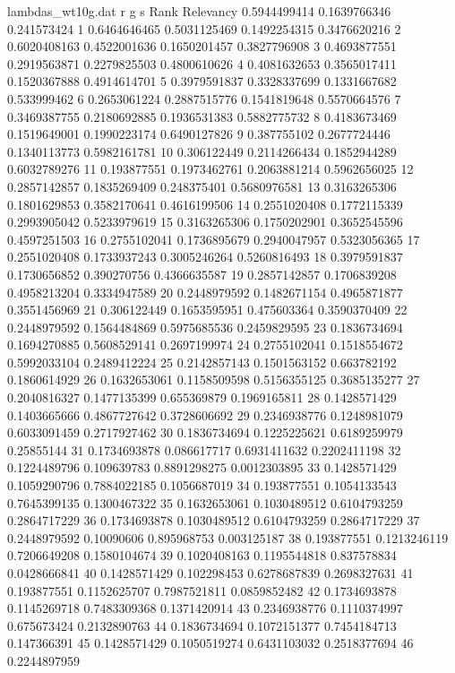 %
%


\begin{filecontents*}{lambdas_wt10g.dat}
r	g	s	Rank	Relevancy
0.5944499414	0.1639766346	0.241573424	1	0.6464646465
0.5031125469	0.1492254315	0.3476620216	2	0.6020408163
0.4522001636	0.1650201457	0.3827796908	3	0.4693877551
0.2919563871	0.2279825503	0.4800610626	4	0.4081632653
0.3565017411	0.1520367888	0.4914614701	5	0.3979591837
0.3328337699	0.1331667682	0.533999462	6	0.2653061224
0.2887515776	0.1541819648	0.5570664576	7	0.3469387755
0.2180692885	0.1936531383	0.5882775732	8	0.4183673469
0.1519649001	0.1990223174	0.6490127826	9	0.387755102
0.2677724446	0.1340113773	0.5982161781	10	0.306122449
0.2114266434	0.1852944289	0.6032789276	11	0.193877551
0.1973462761	0.2063881214	0.5962656025	12	0.2857142857
0.1835269409	0.248375401	0.5680976581	13	0.3163265306
0.1801629853	0.3582170641	0.4616199506	14	0.2551020408
0.1772115339	0.2993905042	0.5233979619	15	0.3163265306
0.1750202901	0.3652545596	0.4597251503	16	0.2755102041
0.1736895679	0.2940047957	0.5323056365	17	0.2551020408
0.1733937243	0.3005246264	0.5260816493	18	0.3979591837
0.1730656852	0.390270756	0.4366635587	19	0.2857142857
0.1706839208	0.4958213204	0.3334947589	20	0.2448979592
0.1482671154	0.4965871877	0.3551456969	21	0.306122449
0.1653595951	0.475603364	0.3590370409	22	0.2448979592
0.1564484869	0.5975685536	0.2459829595	23	0.1836734694
0.1694270885	0.5608529141	0.2697199974	24	0.2755102041
0.1518554672	0.5992033104	0.2489412224	25	0.2142857143
0.1501563152	0.663782192	0.1860614929	26	0.1632653061
0.1158509598	0.5156355125	0.3685135277	27	0.2040816327
0.1477135399	0.655369879	0.1969165811	28	0.1428571429
0.1403665666	0.4867727642	0.3728606692	29	0.2346938776
0.1248981079	0.6033091459	0.2717927462	30	0.1836734694
0.1225225621	0.6189259979	0.25855144	31	0.1734693878
0.086617717	0.6931411632	0.2202411198	32	0.1224489796
0.109639783	0.8891298275	0.0012303895	33	0.1428571429
0.1059290796	0.7884022185	0.1056687019	34	0.193877551
0.1054133543	0.7645399135	0.1300467322	35	0.1632653061
0.1030489512	0.6104793259	0.2864717229	36	0.1734693878
0.1030489512	0.6104793259	0.2864717229	37	0.2448979592
0.10090606	0.895968753	0.003125187	38	0.193877551
0.1213246119	0.7206649208	0.1580104674	39	0.1020408163
0.1195544818	0.837578834	0.0428666841	40	0.1428571429
0.102298453	0.6278687839	0.2698327631	41	0.193877551
0.1152625707	0.7987521811	0.0859852482	42	0.1734693878
0.1145269718	0.7483309368	0.1371420914	43	0.2346938776
0.1110374997	0.675673424	0.2132890763	44	0.1836734694
0.1072151377	0.7454184713	0.147366391	45	0.1428571429
0.1050519274	0.6431103032	0.2518377694	46	0.2244897959

\end{filecontents*}
